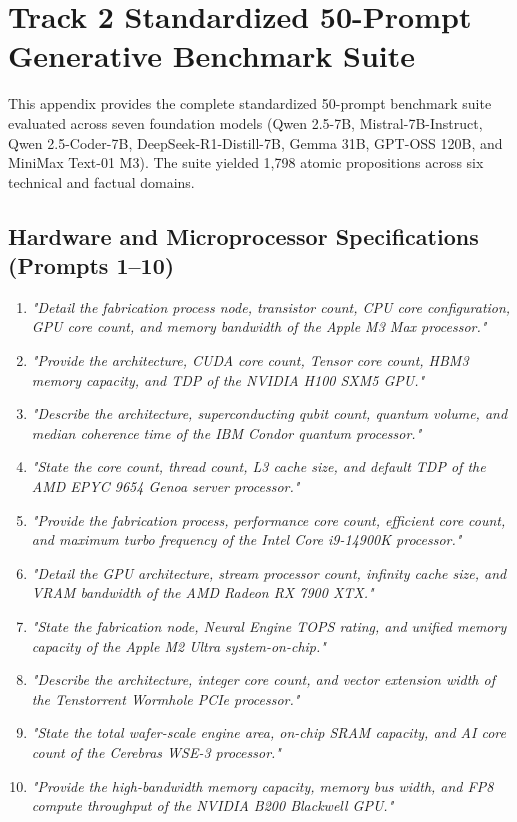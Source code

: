 \chapter{Track 2 Standardized 50-Prompt Generative Benchmark Suite}
\label{app:prompts_suite}

This appendix provides the complete standardized 50-prompt benchmark suite evaluated across seven foundation models (Qwen 2.5-7B, Mistral-7B-Instruct, Qwen 2.5-Coder-7B, DeepSeek-R1-Distill-7B, Gemma 31B, GPT-OSS 120B, and MiniMax Text-01 M3). The suite yielded 1,798 atomic propositions across six technical and factual domains.

\section{Hardware and Microprocessor Specifications (Prompts 1--10)}
\label{sec:app_hardware_prompts}

\begin{enumerate}
    \item \textit{"Detail the fabrication process node, transistor count, CPU core configuration, GPU core count, and memory bandwidth of the Apple M3 Max processor."}
    \item \textit{"Provide the architecture, CUDA core count, Tensor core count, HBM3 memory capacity, and TDP of the NVIDIA H100 SXM5 GPU."}
    \item \textit{"Describe the architecture, superconducting qubit count, quantum volume, and median coherence time of the IBM Condor quantum processor."}
    \item \textit{"State the core count, thread count, L3 cache size, and default TDP of the AMD EPYC 9654 Genoa server processor."}
    \item \textit{"Provide the fabrication process, performance core count, efficient core count, and maximum turbo frequency of the Intel Core i9-14900K processor."}
    \item \textit{"Detail the GPU architecture, stream processor count, infinity cache size, and VRAM bandwidth of the AMD Radeon RX 7900 XTX."}
    \item \textit{"State the fabrication node, Neural Engine TOPS rating, and unified memory capacity of the Apple M2 Ultra system-on-chip."}
    \item \textit{"Describe the architecture, integer core count, and vector extension width of the Tenstorrent Wormhole PCIe processor."}
    \item \textit{"State the total wafer-scale engine area, on-chip SRAM capacity, and AI core count of the Cerebras WSE-3 processor."}
    \item \textit{"Provide the high-bandwidth memory capacity, memory bus width, and FP8 compute throughput of the NVIDIA B200 Blackwell GPU."}
\end{enumerate}

